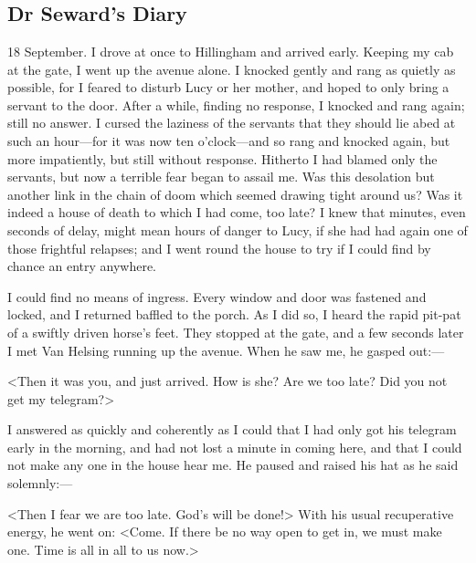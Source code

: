 \chapter[Chapter \thechapter]{}

\section{Dr Seward's Diary}

\begin{diary}{18 September.}
I drove at once to Hillingham and arrived early. Keeping my cab at the gate, I went up the avenue alone. I knocked gently and rang as quietly as possible, for I feared to disturb Lucy or her mother, and hoped to only bring a servant to the door. After a while, finding no response, I knocked and rang again; still no answer. I cursed the laziness of the servants that they should lie abed at such an hour—for it was now ten o'clock—and so rang and knocked again, but more impatiently, but still without response. Hitherto I had blamed only the servants, but now a terrible fear began to assail me. Was this desolation but another link in the chain of doom which seemed drawing tight around us? Was it indeed a house of death to which I had come, too late? I knew that minutes, even seconds of delay, might mean hours of danger to Lucy, if she had had again one of those frightful relapses; and I went round the house to try if I could find by chance an entry anywhere.

I could find no means of ingress. Every window and door was fastened and locked, and I returned baffled to the porch. As I did so, I heard the rapid pit-pat of a swiftly driven horse's feet. They stopped at the gate, and a few seconds later I met Van Helsing running up the avenue. When he saw me, he gasped out:—

<Then it was you, and just arrived. How is she? Are we too late? Did you not get my telegram?>

I answered as quickly and coherently as I could that I had only got his telegram early in the morning, and had not lost a minute in coming here, and that I could not make any one in the house hear me. He paused and raised his hat as he said solemnly:—

<Then I fear we are too late. God's will be done!> With his usual recuperative energy, he went on: <Come. If there be no way open to get in, we must make one. Time is all in all to us now.>


\end{diary}
